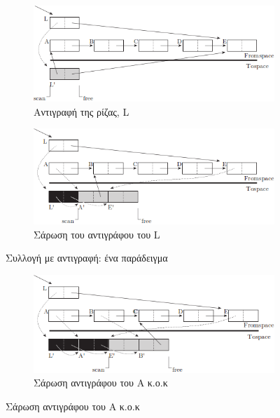 \begin{greek}
\begin{figure}[H]
  \begin{subfigure}[b]{1.0\textwidth}
    \includegraphics{figures/cop_1b}
    \caption{Αντιγραφή της ρίζας, L}
  \end{subfigure}
  
  \begin{subfigure}[b]{1.0\textwidth}
    \includegraphics{figures/cop_1c}
    \caption{Σάρωση του αντιγράφου του L}
  \end{subfigure}
  \caption{Συλλογή με αντιγραφή: ένα παράδειγμα}
  \label{fig:cop_1}
\end{figure}

\begin{figure}[H]
  \ContinuedFloat
  \centering
  \begin{subfigure}{1.0\textwidth}
    \includegraphics{figures/cop_2a}
    \caption{Σάρωση αντιγράφου του Α κ.ο.κ}
  \end{subfigure}


\end{figure}
\end{greek}
